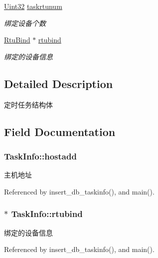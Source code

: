 \begin{DoxyCompactItemize}
\hyperlink{base_8h_a60cf7b3c038ce37a50796e8eaddf0b5f}{Uint32} \hyperlink{structTaskInfo_a0bfa1e0ae661b9841bd77b14b8002c2a}{taskrtunum}
\begin{DoxyCompactList}\small\item\em 绑定设备个数 \end{DoxyCompactList}\item 
\hyperlink{structRtuBind}{Rtu\-Bind} $\ast$ \hyperlink{structTaskInfo_abcd620f1a510696638104149f8c06e2c}{rtubind}
\begin{DoxyCompactList}\small\item\em 绑定的设备信息 \end{DoxyCompactList}\end{DoxyCompactItemize}


\subsection{Detailed Description}
定时任务结构体 

\subsection{Field Documentation}
\hypertarget{structTaskInfo_a633cb279d0c214d3eba9da3d26f5a020}{
\subsubsection[{hostadd}]{ Task\-Info\-::hostadd}}\label{structTaskInfo_a633cb279d0c214d3eba9da3d26f5a020}


主机地址 



Referenced by insert\-\_\-db\-\_\-taskinfo(), and main().

\hypertarget{structTaskInfo_abcd620f1a510696638104149f8c06e2c}{
\subsubsection[{rtubind}]{$\ast$ Task\-Info\-::rtubind}}\label{structTaskInfo_abcd620f1a510696638104149f8c06e2c}


绑定的设备信息 



Referenced by insert\-\_\-db\-\_\-taskinfo(), and main().

